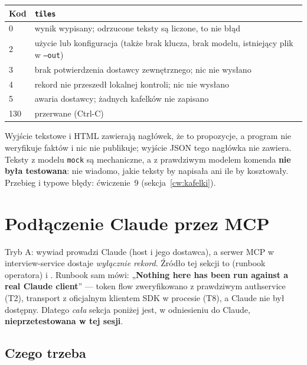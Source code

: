{\begin{center}
\small
\begin{tabularx}{\linewidth}{@{}l>{\raggedright\arraybackslash}X@{}}
\toprule
Kod & \texttt{tiles} \\
\midrule
0 & wynik wypisany; odrzucone teksty są liczone, to nie błąd \\
2 & użycie lub konfiguracja (także brak klucza, brak modelu, istniejący plik w \texttt{--out}) \\
3 & brak potwierdzenia dostawcy zewnętrznego; nic nie wysłano \\
4 & rekord nie przeszedł lokalnej kontroli; nic nie wysłano \\
5 & awaria dostawcy; żadnych kafelków nie zapisano \\
130 & przerwane (Ctrl-C) \\
\bottomrule
\end{tabularx}
\end{center}

Wyjście tekstowe i HTML zawierają nagłówek, że to propozycje, a program nie weryfikuje
faktów i nic nie publikuje; wyjście JSON tego nagłówka nie zawiera. Teksty z modelu
\texttt{mock} są mechaniczne, a z prawdziwym modelem komenda \textbf{nie była
testowana}: nie wiadomo, jakie teksty by napisała ani ile by kosztowały. Przebieg
i typowe błędy: ćwiczenie~9 (sekcja~\ref{cw:kafelki}).

\section{Podłączenie Claude przez MCP}
\label{sec:mcp}

Tryb A: wywiad prowadzi Claude (host i jego dostawca), a serwer MCP w
interview-service dostaje \emph{wyłącznie rekord}. Źródło tej sekcji to
 (runbook operatora) i
. Runbook sam mówi: „\textbf{Nothing here has
been run against a real Claude client}” --- token flow zweryfikowano z prawdziwym
authservice (T2), transport z oficjalnym klientem SDK w procesie (T8), a Claude
nie był dostępny. Dlatego \emph{cała} sekcja poniżej jest, w odniesieniu do
Claude, \textbf{nieprzetestowana w tej sesji}.

\subsection{Czego trzeba}

}
